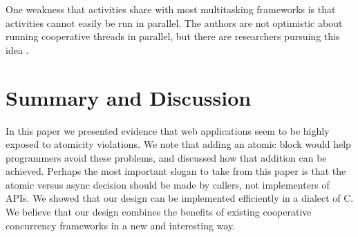 \documentclass[sigplan,10pt,review,anonymous]{acmart}\settopmatter{printfolios=true,printccs=false,printacmref=false}
\begin{document}
One weakness that activities share with most multitasking frameworks is that activities cannot easily be run in parallel.
The authors are not optimistic about running cooperative threads in parallel, but there are researchers pursuing this idea \cite{ONeill2015, Boussinot2006, Dabrowski2006}.







\section{Summary and Discussion}

In this paper we presented evidence that web applications seem to be highly exposed to atomicity violations.
We note that adding an atomic block would help programmers avoid these problems, and discussed how that addition can be achieved.
Perhaps the most important slogan to take from this paper is that the atomic versus async decision should be made by callers, not implementers of APIs.
We showed that our design can be implemented efficiently in a dialect of C.
We believe that our design combines the benefits of existing cooperative concurrency frameworks in a new and interesting way.
\end{document}
